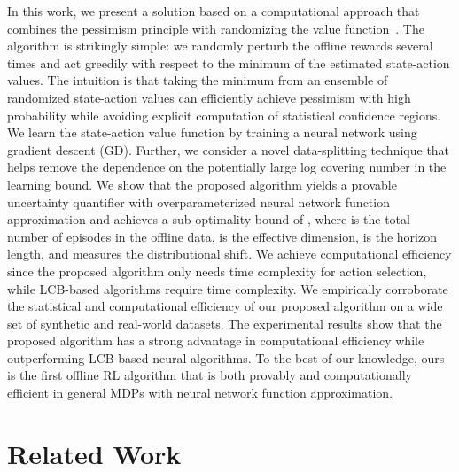 \documentclass{article} \usepackage{iclr2023/iclr2023_conference,times}
\begin{document}
In this work, we present a solution based on a computational approach that combines the pessimism principle with randomizing the value function~\citep{osband2016generalization, ishfaq2021randomized}. The algorithm is strikingly simple: we randomly perturb the offline rewards several times and act greedily with respect to the minimum of the estimated state-action values. The intuition is that taking the minimum from an ensemble of randomized state-action values can efficiently achieve pessimism with high probability while avoiding explicit computation of statistical confidence regions. We learn the state-action value function by training a neural network using gradient descent (GD). Further, we consider a novel data-splitting technique that helps remove the dependence on the potentially large log covering number in the learning bound. We show that the proposed algorithm yields a provable uncertainty quantifier with overparameterized neural network function approximation and achieves a sub-optimality bound of  , where  is the total number of episodes in the offline data,  is the effective dimension,  is the horizon length, and  measures the distributional shift. We achieve computational efficiency since the proposed algorithm only needs  time complexity for action selection, while LCB-based algorithms require   time complexity. We empirically corroborate the statistical and computational efficiency of our proposed algorithm on a wide set of synthetic and real-world datasets. The experimental results show that the proposed algorithm has a strong advantage in computational efficiency while outperforming LCB-based neural algorithms. To the best of our knowledge, ours is the first offline RL algorithm that is both provably and computationally efficient in general MDPs with neural network function approximation. 


















%
 \section{Related Work}
\end{document}
